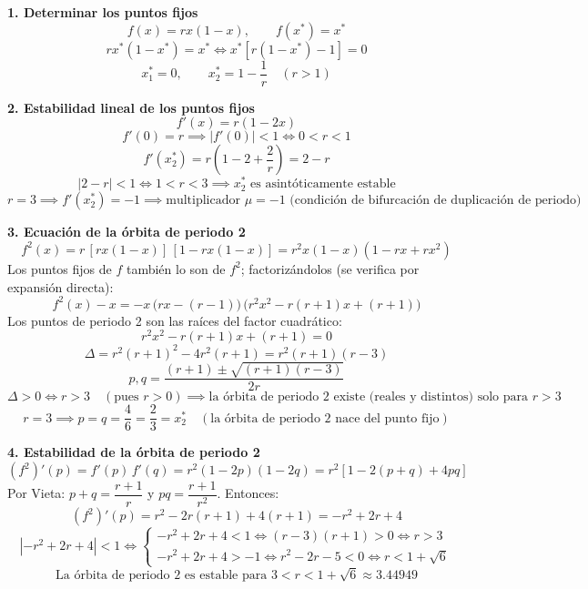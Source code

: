 \documentclass[11pt,a4paper]{article}
\newenvironment{solucion}[1][Solución Detallada]{%
    \vspace{1.5mm}%
    \noindent{\large\textbf{Solución:}}\par\vspace{1.5mm}%
}{%
    \par\vspace{3mm}%
}
\begin{document}
\begin{solucion}

\textbf{\large 1. Determinar los puntos fijos}
\[
f(x) = r x (1 - x), \qquad f(x^*) = x^*
\]
\[
r x^* (1 - x^*) = x^* \iff x^*\left[r(1 - x^*) - 1\right] = 0
\]
\[
\boxed{x_1^* = 0, \qquad x_2^* = 1 - \frac{1}{r} \quad (r > 1)}
\]

\vspace{3.5mm}

\textbf{\large 2. Estabilidad lineal de los puntos fijos}
\[
f'(x) = r(1 - 2x)
\]
\[
f'(0) = r \implies |f'(0)| < 1 \iff 0 < r < 1
\]
\[
f'(x_2^*) = r\left(1 - 2 + \frac{2}{r}\right) = 2 - r
\]
\[
|2 - r| < 1 \iff \boxed{1 < r < 3 \implies x_2^* \text{ es asintóticamente estable}}
\]
\[
r = 3 \implies f'(x_2^*) = -1 \implies \boxed{\text{multiplicador } \mu = -1 \text{ (condición de bifurcación de duplicación de periodo)}}
\]

\vspace{3.5mm}

\textbf{\large 3. Ecuación de la órbita de periodo 2}
\[
f^2(x) = r\,[r x(1-x)]\,[1 - r x(1-x)] = r^2 x(1-x)\left(1 - r x + r x^2\right)
\]
Los puntos fijos de $f$ también lo son de $f^2$; factorizándolos (se verifica por expansión directa):
\[
f^2(x) - x = -x\,\bigl(r x - (r - 1)\bigr)\,\bigl(r^2 x^2 - r(r+1)x + (r+1)\bigr)
\]
Los puntos de periodo 2 son las raíces del factor cuadrático:
\[
r^2 x^2 - r(r+1)x + (r+1) = 0
\]
\[
\Delta = r^2(r+1)^2 - 4r^2(r+1) = r^2 (r+1)(r - 3)
\]
\[
\boxed{p, q = \frac{(r+1) \pm \sqrt{(r+1)(r-3)}}{2r}}
\]
\[
\Delta > 0 \iff r > 3 \quad (\text{pues } r > 0) \implies \boxed{\text{la órbita de periodo 2 existe (reales y distintos) solo para } r > 3}
\]
\[
r = 3 \implies p = q = \frac{4}{6} = \frac{2}{3} = x_2^* \quad (\text{la órbita de periodo 2 nace del punto fijo})
\]

\vspace{3.5mm}

\textbf{\large 4. Estabilidad de la órbita de periodo 2}
\[
(f^2)'(p) = f'(p)\,f'(q) = r^2 (1 - 2p)(1 - 2q) = r^2\left[1 - 2(p + q) + 4pq\right]
\]
Por Vieta: $p + q = \dfrac{r+1}{r}$ y $pq = \dfrac{r+1}{r^2}$. Entonces:
\[
(f^2)'(p) = r^2 - 2r(r+1) + 4(r+1) = -r^2 + 2r + 4
\]
\[
\left|-r^2 + 2r + 4\right| < 1 \iff
\begin{cases}
-r^2 + 2r + 4 < 1 \iff (r-3)(r+1) > 0 \iff r > 3 \\
-r^2 + 2r + 4 > -1 \iff r^2 - 2r - 5 < 0 \iff r < 1 + \sqrt{6}
\end{cases}
\]
\[
\boxed{\text{La órbita de periodo 2 es estable para } 3 < r < 1 + \sqrt{6} \approx 3.44949}
\]


\end{solucion}
\end{document}
